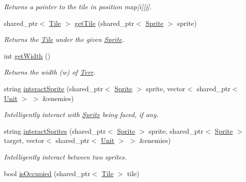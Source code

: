 \begin{DoxyCompactItemize}
\begin{DoxyCompactList}\small\item\em Returns a pointer to the tile in position map\mbox{[}i\mbox{]}\mbox{[}j\mbox{]}. \end{DoxyCompactList}\item 
shared\+\_\+ptr$<$ \hyperlink{class_tile}{Tile} $>$ \hyperlink{class_terr_af54a86143ec520d2b50b912c37db4a5a}{get\+Tile} (shared\+\_\+ptr$<$ \hyperlink{class_sprite}{Sprite} $>$ sprite)\hypertarget{class_terr_af54a86143ec520d2b50b912c37db4a5a}{}\label{class_terr_af54a86143ec520d2b50b912c37db4a5a}

\begin{DoxyCompactList}\small\item\em Returns the \hyperlink{class_tile}{Tile} under the given \hyperlink{class_sprite}{Sprite}. \end{DoxyCompactList}\item 
int \hyperlink{class_terr_a397fdbbeb3fe3eb8989d9da77af42f57}{get\+Width} ()\hypertarget{class_terr_a397fdbbeb3fe3eb8989d9da77af42f57}{}\label{class_terr_a397fdbbeb3fe3eb8989d9da77af42f57}

\begin{DoxyCompactList}\small\item\em Returns the width (w) of \hyperlink{class_terr}{Terr}. \end{DoxyCompactList}\item 
string \hyperlink{class_terr_a673ca282c441e6eea4935bd1ae6afdb7}{interact\+Sprite} (shared\+\_\+ptr$<$ \hyperlink{class_sprite}{Sprite} $>$ sprite, vector$<$ shared\+\_\+ptr$<$ \hyperlink{class_unit}{Unit} $>$ $>$ \&enemies)\hypertarget{class_terr_a673ca282c441e6eea4935bd1ae6afdb7}{}\label{class_terr_a673ca282c441e6eea4935bd1ae6afdb7}

\begin{DoxyCompactList}\small\item\em Intelligently interact with \hyperlink{class_sprite}{Sprite} being faced, if any. \end{DoxyCompactList}\item 
string \hyperlink{class_terr_a00dfea1cd9014d8b368a46ba466a46b2}{interact\+Sprites} (shared\+\_\+ptr$<$ \hyperlink{class_sprite}{Sprite} $>$ sprite, shared\+\_\+ptr$<$ \hyperlink{class_sprite}{Sprite} $>$ target, vector$<$ shared\+\_\+ptr$<$ \hyperlink{class_unit}{Unit} $>$ $>$ \&enemies)\hypertarget{class_terr_a00dfea1cd9014d8b368a46ba466a46b2}{}\label{class_terr_a00dfea1cd9014d8b368a46ba466a46b2}

\begin{DoxyCompactList}\small\item\em Intelligently interact between two sprites. \end{DoxyCompactList}\item 
bool \hyperlink{class_terr_a367ee972d1e3edffe329fb4f7c84ff3e}{is\+Occupied} (shared\+\_\+ptr$<$ \hyperlink{class_tile}{Tile} $>$ tile)\hypertarget{class_terr_a367ee972d1e3edffe329fb4f7c84ff3e}{}\label{class_terr_a367ee972d1e3edffe329fb4f7c84ff3e}


\end{DoxyCompactItemize}
